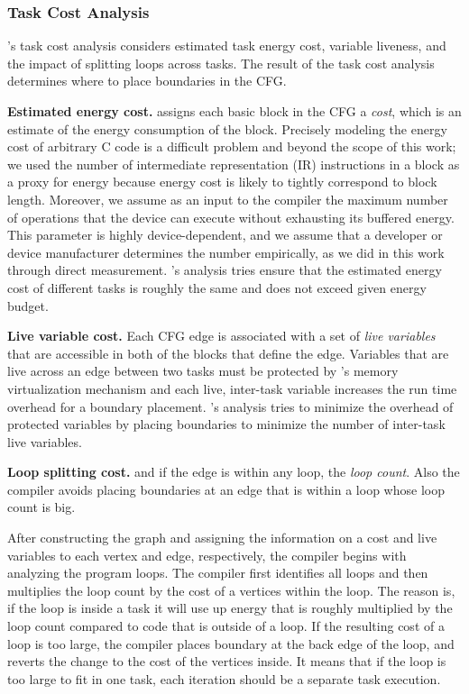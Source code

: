\subsubsection{Task Cost Analysis}
\sys's task cost analysis considers estimated task energy cost, variable
liveness, and the impact of splitting loops across tasks.  The result of the
task cost analysis determines where to place boundaries in the CFG.
 
{\noindent \bf Estimated energy cost.} \sys assigns each basic block in the
CFG a {\em cost}, which is an estimate of the energy consumption of the block.
Precisely modeling the energy cost of arbitrary C code is a difficult problem
and beyond the scope of this work; we used the number of intermediate
representation (IR) instructions in a block as a proxy for energy because
energy cost is likely to tightly correspond  to block length.  Moreover, we
assume as an input to the compiler the maximum number of operations that the
device can execute without exhausting its buffered energy. This parameter is
highly device-dependent, and we assume that a developer or device manufacturer
determines the number empirically, as we did in this work through direct
measurement.  \sys's analysis tries ensure that the estimated energy cost of different tasks
is roughly the same and does not exceed given energy budget. 

{\noindent \bf Live variable cost.}
Each CFG edge is associated with a set of {\em live variables} that are
accessible in both of the blocks that define the edge.  Variables that are live
across an edge between two tasks must be protected by \sys's memory
virtualization mechanism and each live, inter-task variable increases the run
time overhead for a boundary placement.  \sys's analysis tries to minimize the
overhead of protected variables by placing boundaries to minimize the number of
inter-task live variables.


{\noindent \bf Loop splitting cost.}
and if the edge is within any loop, the {\em loop count}. 
Also the compiler avoids placing boundaries at an edge that is
within a loop whose loop count is big.

After constructing the graph and assigning the information on a cost and live
variables to each vertex and edge, respectively, the compiler begins with
analyzing the program loops. The compiler first identifies all loops and then
multiplies the loop count by the cost of a vertices within the loop. The reason
is, if the loop is inside a task it will use up energy that is roughly
multiplied by the loop count compared to code that is outside of a loop. If the
resulting cost of a loop is too large, the compiler places boundary at the back edge of the loop,
and reverts the change to the cost of the vertices inside. It means that if the
loop is too large to fit in one task, each iteration should be a separate task
execution.

